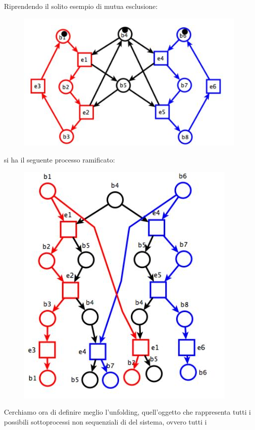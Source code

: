 \documentclass[a4paper,12pt, oneside]{book}
\begin{document}
\begin{esempio}
  Riprendendo il solito esempio di mutua esclusione:
  \begin{figure}[H]
    \centering
    \includegraphics[scale = 0.45]{img/ram0.jpg} 
  \end{figure}
  \newpage
  si ha il seguente processo ramificato:
  \begin{figure}[H]
    \centering
    \includegraphics[scale = 0.45]{img/ram.jpg} 
  \end{figure}
  
\end{esempio}
\noindent
Cerchiamo ora di definire meglio l'unfolding, quell'oggetto che rappresenta
tutti i possibili sottoprocessi non sequenziali di del sistema, ovvero tutti i
\end{document}
